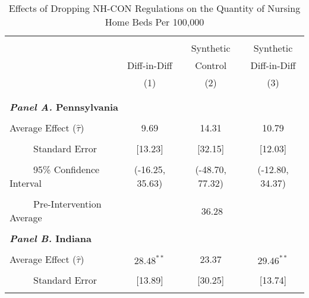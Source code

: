 \documentclass[../Main.tex]{subfiles}
\begin{document}
\newpage
\null
\vfill
\begin{table}[htbp]\centering \footnotesize
\def\sym#1{\ifmmode^{#1}\else\(^{#1}\)\fi}
\captionsetup{width=.75\textwidth}
\caption{\centering Effects of Dropping NH-CON Regulations on the Quantity of Nursing Home Beds Per 100,000}
\label{tab:ave_results_q_nhb}
\setlength{\tabcolsep}{10pt}
\begin{tabular}{l*{3}{c}}
\hline\hline
\\[-2ex]
&\multicolumn{1}{c}{}&\multicolumn{1}{c}{Synthetic}&\multicolumn{1}{c}{Synthetic}\\
&\multicolumn{1}{c}{Diff-in-Diff}&\multicolumn{1}{c}{Control}&\multicolumn{1}{c}{Diff-in-Diff}\\
&\multicolumn{1}{c}{(1)}&\multicolumn{1}{c}{(2)}&\multicolumn{1}{c}{(3)}\\
\\[-2ex]
\hline
\\[-.1ex]
\multicolumn{4}{l}{\textbf{\textit{Panel A.} Pennsylvania}}\\
\\[-1.5ex]
\multicolumn{1}{l}{Average Effect ($\hat{\tau}$)}&   \multicolumn{1}{c}{9.69}&   \multicolumn{1}{c}{14.31}&  \multicolumn{1}{c}{10.79}\\
\\[-2ex]
\multicolumn{1}{l}{\ \ \ \ \ Standard Error}  &\multicolumn{1}{c}{[13.23]}&\multicolumn{1}{c}{[32.15]}&\multicolumn{1}{c}{[12.03]}\\
\\[-2ex]
\multicolumn{1}{l}{\ \ \ \ \ 95\% Confidence Interval}&   \multicolumn{1}{c}{(-16.25, 35.63)}&   \multicolumn{1}{c}{(-48.70, 77.32)}&   \multicolumn{1}{c}{(-12.80, 34.37)}\\
\\[-2ex]
\multicolumn{1}{l}{\ \ \ \ \ Pre-Intervention Average}&   \multicolumn{3}{c}{36.28}\\
\\[-.1ex]
\multicolumn{4}{l}{\textbf{\textit{Panel B.} Indiana}}\\
\\[-1.5ex]
\multicolumn{1}{l}{Average Effect ($\hat{\tau}$)}&   \multicolumn{1}{c}{$28.48^{**}$}&   \multicolumn{1}{c}{23.37}&  \multicolumn{1}{c}{$29.46^{**}$}\\
\\[-2ex]
\multicolumn{1}{l}{\ \ \ \ \ Standard Error}  &\multicolumn{1}{c}{[13.89]}&\multicolumn{1}{c}{[30.25]}&\multicolumn{1}{c}{[13.74]}\\
\\[-2ex]

\end{tabular}
\end{table}
\end{document}

